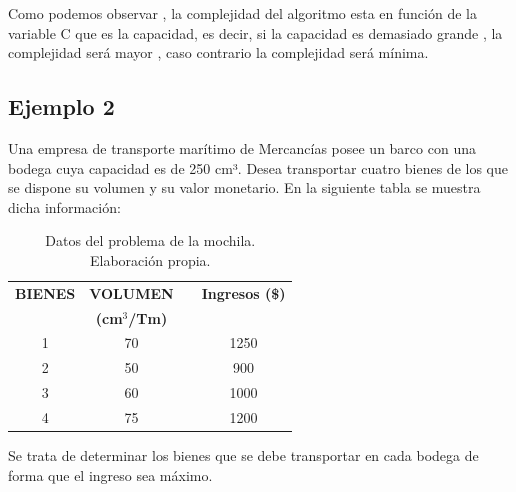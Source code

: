 Como podemos observar , la complejidad del algoritmo esta en función de la variable C que es la capacidad, es decir, si la capacidad es demasiado grande  , la complejidad será mayor , caso contrario la complejidad será mínima.

\subsection{Ejemplo 2}
Una empresa de transporte marítimo de Mercancías posee un barco con una bodega cuya capacidad es de 250 cm³. Desea transportar cuatro bienes de los que se dispone su volumen y su valor monetario. En la siguiente tabla se muestra dicha información:


\begin{table}[h!]
	\centering
	\begin{tabular}{cccc}
		\toprule
		\textbf{BIENES} & \textbf{VOLUMEN} & & \textbf{Ingresos (\$)} \\
		& \textbf{(cm\(^3\)/Tm)} & & \\
		\midrule
		1 & 70 & & 1250 \\
		2 & 50 & & 900 \\
		3 & 60 & & 1000 \\
		4 & 75 & & 1200 \\
		\bottomrule
	\end{tabular}
	\caption{Datos del problema de la mochila. Elaboración propia.}
	\label{tab:datos_problema}
\end{table}

Se trata de determinar los bienes que se debe transportar en cada bodega de forma que el ingreso sea máximo. 

